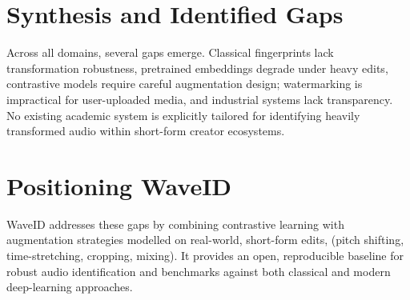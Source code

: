\documentclass[../Thesis]{subfiles}
\begin{document}
\section{Synthesis and Identified Gaps}
Across all domains, several gaps emerge. Classical fingerprints lack transformation robustness, pretrained embeddings degrade under heavy edits, contrastive models require careful augmentation design; watermarking is impractical for user-uploaded media, and industrial systems lack transparency. No existing academic system is explicitly tailored for identifying heavily transformed audio within short-form creator ecosystems.

\section{Positioning WaveID}
WaveID addresses these gaps by combining contrastive learning with augmentation strategies modelled on real-world, short-form edits, (pitch shifting, time-stretching, cropping, mixing). It provides an open, reproducible baseline for robust audio identification and benchmarks against both classical and modern deep-learning approaches.
\end{document}
